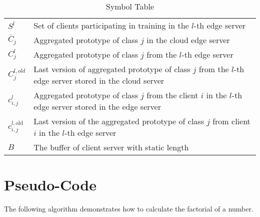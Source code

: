 \documentclass{article}
\begin{document}
\begin{table}[h!]
\begin{tabular}{@{}lp{10cm}@{}}
        \( S^{l} \)                    & Set of clients participating in training in the \( l \)-th edge server                                           \\
        \( \bar{C}_j \)                & Aggregated prototype of class $j$ in the cloud
        edge server                                                                                                                                       \\
        \( C^l_j \)                    & Aggregated prototype of class $j$ from the \( l \)-th edge server                                                \\
        \( C^{l,old}_j \)              & Last version of aggregated prototype of class $j$ from the \( l \)-th edge server stored in the cloud server     \\
        \( c^l_{i, j} \)               & Aggregated prototype of class $j$ from the client \(i\) in  the \( l \)-th edge server stored in the edge server \\
        \( c_{i, j}^{l, \text{old}} \) & Last version of the aggregated prototype of class \( j \) from client \( i \) in the \( l \)-th edge server      \\
        \( B \)                        & The buffer of client server with static length                                                                   \\
        \bottomrule
    \end{tabular}
    \caption{Symbol Table}
\end{table}

\section{Pseudo-Code}
The following algorithm demonstrates how to calculate the factorial of a number.
\end{document}
